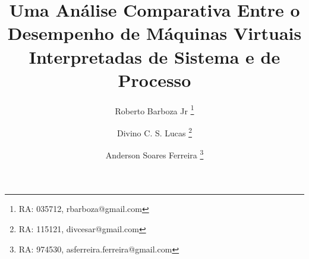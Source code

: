 \documentclass[11pt,twoside]{article}
\begin{document}
% 

%



\TRMakeCover


%
\pagestyle{myheadings}

%
\title{Uma Análise Comparativa Entre o Desempenho de Máquinas Virtuais Interpretadas de Sistema e de Processo}

\author{
 Roberto Barboza Jr
   \thanks{RA: 035712, rbarboza@gmail.com} \and
 Divino C. S. Lucas
   \thanks{RA: 115121, divcesar@gmail.com} \and
 Anderson Soares Ferreira
   \thanks{RA: 974530, asferreira.ferreira@gmail.com}
}

\date{}

\maketitle

\end{document}
